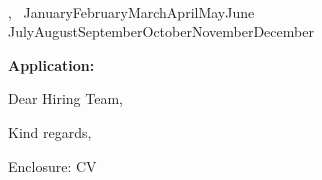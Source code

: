 \documentclass[a4paper,11pt]{article}
\newcommand{\sep}{\enspace\textbar\enspace}
\newcommand{\letterdate}{\number\day\ \ifcase\month\or January\or February\or March\or April\or May\or June\or
  July\or August\or September\or October\or November\or December\fi\ \number\year}
\providecommand{\llocation}{}
\providecommand{\lgreeting}{Dear Hiring Team,}
\begin{document}
\begin{center}
  {\LARGE\bfseries \cvname}\par\smallskip
  \small \cvlocation\sep \cvphone\sep \href{mailto:\cvemail}{\cvemail}\\
  \href{https://\cvlinkedin}{\cvlinkedin}\sep \href{https://\cvgithub}{\cvgithub}
\end{center}
\vspace{0.8em}

\begin{minipage}[t]{0.5\textwidth}
  \lcompany\ifdefempty{\llocation}{}{\\\llocation}
\end{minipage}\hfill
\begin{minipage}[t]{0.48\textwidth}\raggedleft
  \cvlocation, \letterdate
\end{minipage}

\vspace{1.2em}
\textbf{Application: \lposition}

\lgreeting

\lbody

Kind regards,\par\vspace{0.2em}
\cvname

\vspace{0.6em}
{\small Enclosure: CV}
\end{document}
